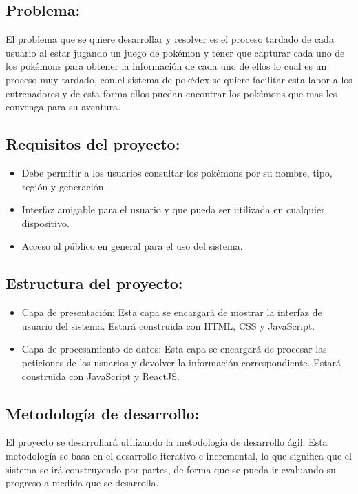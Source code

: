\documentclass[12pt]{article}
\begin{document}
        \subsection{Problema:}
            El problema que se quiere desarrollar y resolver es el proceso tardado de cada usuario al estar jugando un juego de pokémon y tener que capturar cada uno de los pokémons para obtener la información de cada uno de ellos lo cual es un proceso muy tardado, con el sistema de pokédex se quiere facilitar esta labor a los entrenadores y de esta forma ellos puedan encontrar los pokémons que mas les convenga para su aventura.
        \subsection{Requisitos del proyecto: }
            \begin{itemize}
                \item Debe permitir a los usuarios consultar los pokémons por su nombre, tipo, región y generación.
                \item Interfaz amigable para el usuario y que pueda ser utilizada en cualquier dispositivo.
                \item Acceso al público en general para el uso del sistema.
            \end{itemize}
            \vspace{3cm}
        \subsection{Estructura del proyecto: }
            \begin{itemize}
                \item Capa de presentación: Esta capa se encargará de mostrar la interfaz de usuario del sistema. Estará construida con HTML, CSS y JavaScript.
                \item Capa de procesamiento de datos: Esta capa se encargará de procesar las peticiones de los usuarios y devolver la información correspondiente. Estará construida con JavaScript y ReactJS.
            \end{itemize}
        \subsection{Metodología de desarrollo: }
        El proyecto se desarrollará utilizando la metodología de desarrollo ágil. Esta metodología se basa en el desarrollo iterativo e incremental, lo que significa que el sistema se irá construyendo por partes, de forma que se pueda ir evaluando su progreso a medida que se desarrolla.
\end{document}

